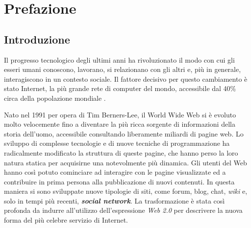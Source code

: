 \part{Prefazione}

\chapter*{Introduzione}





Il progresso tecnologico degli ultimi anni ha rivoluzionato il modo con cui gli esseri umani conoscono, lavorano, si relazionano con gli altri e, più in generale, interagiscono 
in un contesto sociale. Il fattore decisivo per questo cambiamento è stato Internet, la più grande rete di computer del mondo, accessibile dal 40\% circa della popolazione 
mondiale \cite{URL:internetstats}.

Nato nel 1991 per opera di Tim Berners-Lee, il World Wide Web si è evoluto molto velocemente fino a diventare la più ricca sorgente di informazioni della storia dell’uomo, 
accessibile consultando liberamente miliardi di pagine web. Lo sviluppo di complesse tecnologie e di nuove tecniche di programmazione ha radicalmente modificato la struttura 
di queste pagine, che hanno perso la loro natura statica per acquisirne una notevolmente più dinamica. Gli utenti del Web hanno così potuto cominciare ad interagire con le 
pagine visualizzate ed a contribuire in prima persona alla pubblicazione di nuovi contenuti. In questa maniera si sono sviluppate nuove tipologie di siti, come 
forum, blog, chat, \textit{wiki} e, solo in tempi più recenti, \textbf{\textit{social network}}. La trasformazione è stata così profonda da indurre all’utilizzo dell’espressione \textit{Web 2.0}
per descrivere la nuova forma del più celebre servizio di Internet.

